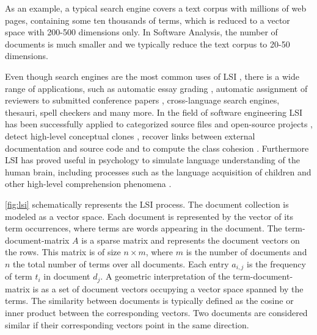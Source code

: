 \documentclass[10pt]{book}
\begin{document}
As an example, a typical search engine covers a text corpus with millions of web pages, containing some ten thousands of terms, which is reduced to a vector space with 200-500 dimensions only. In Software Analysis, the number of documents is much smaller and we typically reduce the text corpus to 20-50 dimensions.

Even though search engines are the most common uses of LSI \cite{Berr94a}, there is a wide range of applications, such as automatic essay grading \cite{Folt99a}, automatic assignment of reviewers to submitted conference papers \cite{Duma92a},  cross-language search engines, thesauri, spell checkers and many more.
In the field of software engineering LSI has been successfully applied to categorized source files \cite{Male00a} and open-source projects \cite{Kawa04a}, detect high-level conceptual clones \cite{Marc01a}, recover links between external documentation and source code \cite{Luci04a,Marc05a} and to compute the class cohesion \cite{Marc05a}. Furthermore LSI has proved useful in psychology to simulate language understanding of the human brain, including processes such as the language acquisition of children and other high-level comprehension phenomena \cite{Land97a}.

\autoref{fig:lsi} schematically represents the LSI process. The document collection is modeled as a vector space. Each document is represented by the vector of its term occurrences, where terms are words appearing in the document. The term-document-matrix $A$ is a sparse matrix and represents the document vectors on the rows. This matrix is of size $n \times m$, where $m$ is the number of documents and $n$ the total number of terms over all documents. Each entry $a_{i,j}$ is the frequency of term $t_i$ in document $d_j$. A geometric interpretation of the term-document-matrix is as a set of document vectors occupying a vector space spanned by the terms. The similarity between documents is typically defined as the cosine or inner product between the corresponding vectors. Two documents are considered similar if their corresponding vectors point in the same direction.
\end{document}
